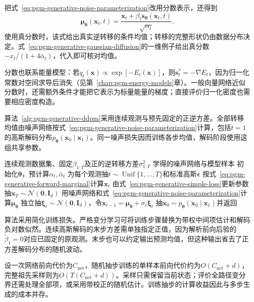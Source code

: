 把式~\eqref{eq:pgm-generative-noise-parameterization}改用分数表示，还得到
\[
  \bm{\mu}_{\bm{\theta}}(\bm{x}_t,t)
    =\frac{\bm{x}_t+\beta_t\bm{s}_{\bm{\theta}}(\bm{x}_t,t)}
            {\sqrt{\alpha_t}}.
\]
使用真分数时，该式给出真实逆转移的条件均值；转移的完整形状仍由数据分布决定。式~\eqref{eq:pgm-generative-gaussian-diffusion}的一维例子给出真分数$-x_t/(1+4\bar{\alpha}_t)$，代入即可核对均值。

分数也联系能量模型：若$q_t(\bm{x})\propto\exp[-E_t(\bm{x})]$，则$\bm{s}_t^*=-\nabla E_t$，因为归一化常数对空间求导后消失（见第~\ref{chap:pgm-energy-models}章）。一般向量网络近似分数时，还需额外条件才能把它表示为标量能量的梯度；直接评价归一化密度也需要相应密度构造。

算法~\ref{alg:pgm-generative-ddpm}采用连续观测与预先固定的正逆方差。全部转移均值由噪声网络按式~\eqref{eq:pgm-generative-noise-parameterization}计算，包括$t=1$的高斯解码分布$p_{\bm{\theta}}(\bm{x}_0\mid\bm{x}_1)$。同一噪声损失因而训练各步均值，解码阶段使用这组共享参数。

\begin{algorithm}[固定方差DDPM的学习与祖先采样]
  \label{alg:pgm-generative-ddpm}
  \begin{algorithmic}[1]
    \Require 连续观测数据集、固定$\beta_{1:T}$及正的逆转移方差$\sigma_{1:T}^2$
    \Ensure 学得的噪声网络与模型样本
    \State 初始化$\bm{\theta}$，预计算$\alpha_t,\bar{\alpha}_t$
      \State 为每个观测抽$t\sim\operatorname{Unif}\{1,\ldots,T\}$和标准高斯$\bm{\epsilon}$
      \State 按式~\eqref{eq:pgm-generative-forward-marginal}计算$\bm{x}_t$
      \State 由式~\eqref{eq:pgm-generative-simple-loss}更新参数
    \EndFor
    \State 抽$\bm{x}_T\sim\mathcal{N}(\bm{0},\bm{I}_d)$
      \State 用噪声网络和式~\eqref{eq:pgm-generative-noise-parameterization}计算$\bm{\mu}_{\bm{\theta}}$
      \State 独立抽$\bm{\xi}_t\sim\mathcal{N}(\bm{0},\bm{I}_d)$，令$\bm{x}_{t-1}=\bm{\mu}_{\bm{\theta}}+\sigma_t\bm{\xi}_t$
    \EndFor
    \State 抽$\bm{x}_0\sim p_{\bm{\theta}}(\bm{x}_0\mid\bm{x}_1)$并返回
  \end{algorithmic}
\end{algorithm}

算法采用简化训练损失。严格变分学习可将训练步骤替换为带权中间项估计和解码负对数似然。连续高斯解码的末步方差需单独指定正值，因为解析前向后验的$\widetilde{\beta}_1=0$对应已固定的原观测。末步也可以约定输出预测均值，但这种输出省去了正方差解码分布的随机波动。

设一次网络前向代价为$C_{\mathrm{net}}$，随机抽步训练的单样本前向代价约为$O(C_{\mathrm{net}}+d)$，完整祖先采样则为$O(T(C_{\mathrm{net}}+d))$。采样只需保留当前状态；评价全路径变分界还需处理全部项，或采用带校正的随机估计。训练抽步的计算收益因此与多步生成的成本并存。

